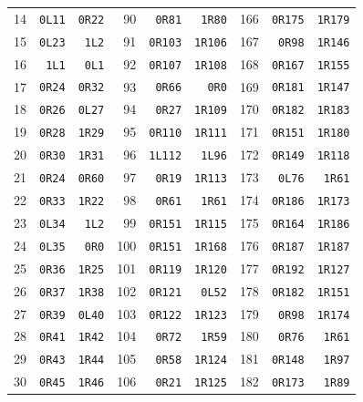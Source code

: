 {\begin{longtable}{rrr@{\hspace{8mm}}rrr@{\hspace{8mm}}rrr}
14 & \texttt{0L11} & \texttt{0R22} & 90 & \texttt{0R81} & \texttt{1R80} & 166 & \texttt{0R175} & \texttt{1R179}\\
15 & \texttt{0L23} & \texttt{1L2} & 91 & \texttt{0R103} & \texttt{1R106} & 167 & \texttt{0R98} & \texttt{1R146}\\
16 & \texttt{1L1} & \texttt{0L1} & 92 & \texttt{0R107} & \texttt{1R108} & 168 & \texttt{0R167} & \texttt{1R155}\\
17 & \texttt{0R24} & \texttt{0R32} & 93 & \texttt{0R66} & \texttt{0R0} & 169 & \texttt{0R181} & \texttt{1R147}\\
18 & \texttt{0R26} & \texttt{0L27} & 94 & \texttt{0R27} & \texttt{1R109} & 170 & \texttt{0R182} & \texttt{1R183}\\
19 & \texttt{0R28} & \texttt{1R29} & 95 & \texttt{0R110} & \texttt{1R111} & 171 & \texttt{0R151} & \texttt{1R180}\\
20 & \texttt{0R30} & \texttt{1R31} & 96 & \texttt{1L112} & \texttt{1L96} & 172 & \texttt{0R149} & \texttt{1R118}\\
21 & \texttt{0R24} & \texttt{0R60} & 97 & \texttt{0R19} & \texttt{1R113} & 173 & \texttt{0L76} & \texttt{1R61}\\
22 & \texttt{0R33} & \texttt{1R22} & 98 & \texttt{0R61} & \texttt{1R61} & 174 & \texttt{0R186} & \texttt{1R173}\\
23 & \texttt{0L34} & \texttt{1L2} & 99 & \texttt{0R151} & \texttt{1R115} & 175 & \texttt{0R164} & \texttt{1R186}\\
24 & \texttt{0L35} & \texttt{0R0} & 100 & \texttt{0R151} & \texttt{1R168} & 176 & \texttt{0R187} & \texttt{1R187}\\
25 & \texttt{0R36} & \texttt{1R25} & 101 & \texttt{0R119} & \texttt{1R120} & 177 & \texttt{0R192} & \texttt{1R127}\\
26 & \texttt{0R37} & \texttt{1R38} & 102 & \texttt{0R121} & \texttt{0L52} & 178 & \texttt{0R182} & \texttt{1R151}\\
27 & \texttt{0R39} & \texttt{0L40} & 103 & \texttt{0R122} & \texttt{1R123} & 179 & \texttt{0R98} & \texttt{1R174}\\
28 & \texttt{0R41} & \texttt{1R42} & 104 & \texttt{0R72} & \texttt{1R59} & 180 & \texttt{0R76} & \texttt{1R61}\\
29 & \texttt{0R43} & \texttt{1R44} & 105 & \texttt{0R58} & \texttt{1R124} & 181 & \texttt{0R148} & \texttt{1R97}\\
30 & \texttt{0R45} & \texttt{1R46} & 106 & \texttt{0R21} & \texttt{1R125} & 182 & \texttt{0R173} & \texttt{1R89}\\

\end{longtable}}
